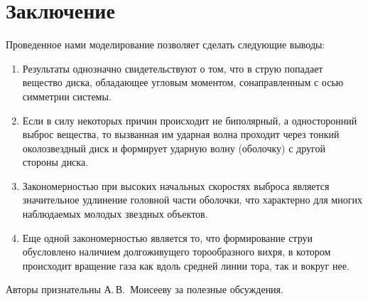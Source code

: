 \section*{Заключение}
\label{sect:kmx:conclusion}


Проведенное нами моделирование позволяет сделать следующие выводы:

\begin{enumerate}
\item Результаты однозначно свидетельствуют о том, что в струю
попадает вещество диска, обладающее угловым моментом, сонаправленным
с осью симметрии \hbox{системы.}

\item Если в силу некоторых причин происходит не биполярный, а
односторонний выброс вещества, то вызванная им ударная волна
проходит через тонкий околозвездный диск и формирует ударную волну
(оболочку) с другой стороны диска.

\item Закономерностью при высоких начальных скоростях выброса
является значительное удлинение головной части оболочки, что
характерно для многих наблюдаемых молодых звездных объектов.

\item Еще одной закономерностью является то, что формирование струи
обусловлено наличием долгоживущего торообразного вихря,
в котором происходит вращение
газа как вдоль средней линии тора, так и вокруг нее.
\end{enumerate}

Авторы признательны А.\,В.~Моисееву за полезные обсуждения.

